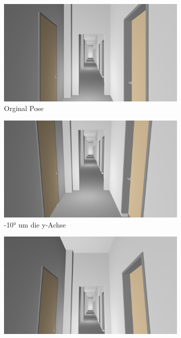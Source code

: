\begin{figure}[H]
	\centering
	\begin{subfigure}[t]{0.18\linewidth}
		\centering
		\includegraphics[width=\linewidth]{images/syn_dataset/00023.png}
		\caption{Orginal Pose \vspace{\fill}}
		\label{subfig:iz0_y0}
	\end{subfigure}
	\hfill 
	\begin{subfigure}[t]{0.18\linewidth}
		\centering
		\includegraphics[width=\linewidth]{images/syn_dataset/00021.png}
		\caption{-10° um die y-Achse}
		\label{subfig:iz0_y-10}
	\end{subfigure}
	\hfill
	\begin{subfigure}[t]{0.18\linewidth}
		\centering
		\includegraphics[width=\linewidth]{images/syn_dataset/00020.png}

\end{subfigure}
\end{figure}
